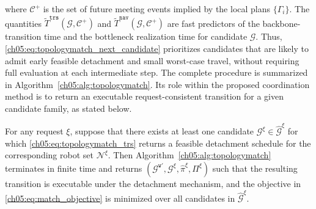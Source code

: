 where \(\mathcal{C}^{+}\) is the set of future meeting events
implied by the local plans \(\{\Gamma_i\}\). The quantities
\(\widetilde{T}^{\texttt{trs}}(\mathcal{G},\mathcal{C}^{+})\) and
\(\widetilde{T}^{\texttt{nav}}(\mathcal{G},\mathcal{C}^{+})\) are
fast predictors of the backbone-transition time and the bottleneck
realization time for candidate \(\mathcal{G}\). Thus,
\eqref{ch05:eq:topologymatch_next_candidate} prioritizes candidates that
are likely to admit early feasible detachment and small worst-case
travel, without requiring full evaluation at each intermediate step.
The complete procedure is summarized in
Algorithm~\ref{ch05:alg:topologymatch}. Its role within the proposed
coordination method is to return an executable request-consistent
transition for a given candidate family, as stated below.

\begin{lemma}
\label{ch05:thm:topologymatch-exec-short}
For any request \(\xi\), suppose that there exists at least one
candidate \(\mathcal{G}^{\xi}\in\widehat{\mathcal{G}}^{\xi}\) for
which \eqref{ch05:eq:topologymatch_trs} returns a feasible detachment
schedule for the corresponding robot set \(\mathcal{N}^{\xi}\). Then
Algorithm~\ref{ch05:alg:topologymatch} terminates in finite time and returns
\((\mathcal{G}^{\texttt{w}'},\mathcal{G}^{\xi},
\widehat{\pi}^{\xi},\Pi^{\xi})\) such that the resulting transition is
executable under the detachment mechanism, and the objective in
\eqref{ch05:eq:match_objective} is minimized over all candidates in
\(\widehat{\mathcal{G}}^{\xi}\).
\end{lemma}
